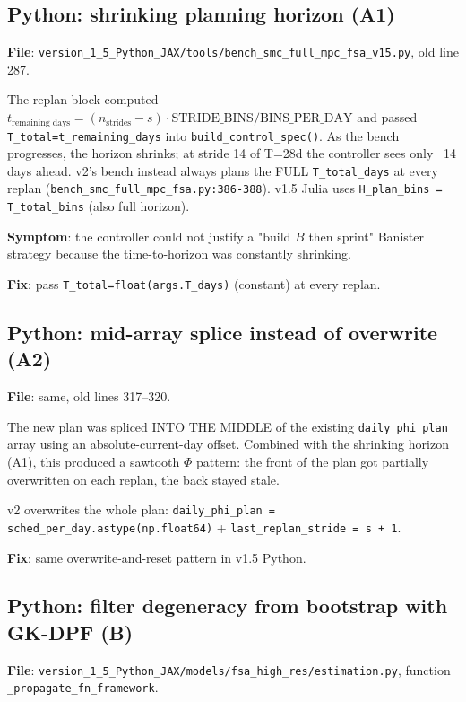 \documentclass[11pt,a4paper]{article}
\begin{document}
\subsection{Python: shrinking planning horizon (A1)}

\textbf{File}: \texttt{version\_1\_5\_Python\_JAX/tools/bench\_smc\_full\_mpc\_fsa\_v15.py},
old line 287.

The replan block computed
$t_{\text{remaining\_days}} = (n_{\text{strides}} - s) \cdot
\text{STRIDE\_BINS} / \text{BINS\_PER\_DAY}$ and passed
\texttt{T\_total=t\_remaining\_days} into
\texttt{build\_control\_spec()}. As the bench progresses, the
horizon shrinks; at stride 14 of T=28d the controller sees only
~14 days ahead. v2's bench instead always plans the FULL
\texttt{T\_total\_days} at every replan
(\texttt{bench\_smc\_full\_mpc\_fsa.py:386-388}). v1.5 Julia uses
\texttt{H\_plan\_bins = T\_total\_bins} (also full horizon).

\textbf{Symptom}: the controller could not justify a "build $B$
then sprint" Banister strategy because the time-to-horizon was
constantly shrinking.

\textbf{Fix}: pass \texttt{T\_total=float(args.T\_days)} (constant)
at every replan.

\subsection{Python: mid-array splice instead of overwrite (A2)}

\textbf{File}: same, old lines 317--320.

The new plan was spliced INTO THE MIDDLE of the existing
\texttt{daily\_phi\_plan} array using an absolute-current-day
offset. Combined with the shrinking horizon (A1), this produced a
sawtooth $\Phi$ pattern: the front of the plan got partially
overwritten on each replan, the back stayed stale.

v2 overwrites the whole plan: \texttt{daily\_phi\_plan =
sched\_per\_day.astype(np.float64)} +
\texttt{last\_replan\_stride = s + 1}.

\textbf{Fix}: same overwrite-and-reset pattern in v1.5 Python.

\subsection{Python: filter degeneracy from bootstrap with GK-DPF (B)}

\textbf{File}: \texttt{version\_1\_5\_Python\_JAX/models/fsa\_high\_res/estimation.py},
function \texttt{\_propagate\_fn\_framework}.
\end{document}
